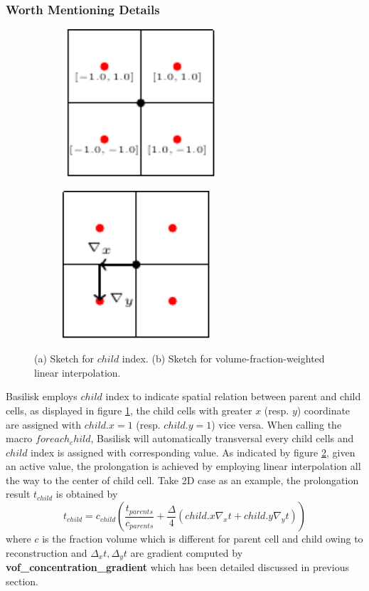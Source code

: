 \documentclass[a4paper]{article}
\newcommand{\func}[1]{\textbf{\textcolor{function}{#1}}}
\begin{document}
\subsubsection{Worth Mentioning Details}
\begin{figure}[!htbp]
    \centering
    \begin{subfigure}[b]{0.45\textwidth}
        \centering
        \includegraphics[height=5.5cm]{image/child.pdf}
        \subcaption{}
        \label{fig:child_a}
    \end{subfigure}
    \begin{subfigure}[b]{0.45\textwidth}
        \centering
        \includegraphics[height=5.5cm]{image/childgradient.pdf}
        \subcaption{}
        \label{fig:child_b}
    \end{subfigure}
    \caption{(a) Sketch for $child$ index. (b) Sketch for volume-fraction-weighted linear interpolation.}
    \label{fig:child}
\end{figure}
Basilisk employs $child$ index to indicate spatial relation between parent and child cells, as displayed in figure \ref{fig:child_a}, the child cells with greater $x$ (resp. $y$) coordinate are assigned with $child.x = 1$ (resp. $child.y = 1$) vice versa. When calling the macro $foreach_child$, Basilisk will automatically transversal every child cells and $child$ index is assigned with corresponding value. As indicated by figure \ref{fig:child_b}, given an active value, the prolongation is achieved by employing linear interpolation all the way to the center of child cell. Take 2D case as an example, the prolongation result $t_{child}$ is obtained by 
\begin{equation}\label{equ:prolongation}
    t_{child} = c_{child}(\frac{t_{parents}}{c_{parents}} + \frac{\Delta}{4}(child.x\nabla_xt+child.y\nabla_yt))
\end{equation}
where $c$ is the fraction volume which is different for parent cell and child owing to reconstruction and $\Delta_xt,\Delta_yt$ are gradient computed by \func{vof\_concentration\_gradient} which has been detailed discussed in previous section.
\end{document}
